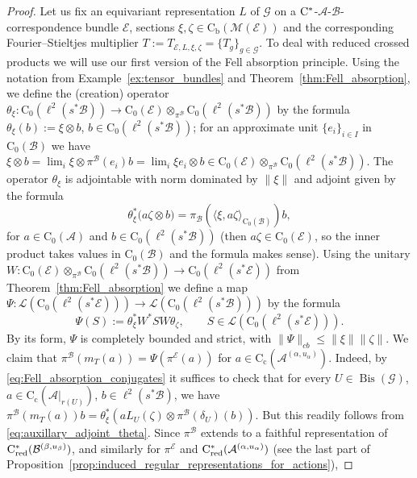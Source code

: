 \documentclass[11 pt, leqno]{amsart}
\numberwithin{equation}{section}
\theoremstyle{plain}
\theoremstyle{definition}
\newcommand*{\contc}{\mathrm{C_c}}%
\newcommand*{\contz}{\mathrm{C_0}}%
\newcommand*{\contb}{\mathrm{C_b}}%
\DeclareMathOperator{\red}{red}%
\DeclareMathOperator{\dashind}{-Ind}
\DeclareMathOperator{\Bis}{Bis}
\newcommand{\B}{\mathcal B}
\newcommand{\LL}{\mathcal L}
\newcommand{\M}{\mathcal M}
\newcommand{\m}{m}
\newcommand{\G}{\mathcal G} %
\newcommand{\EE}{\mathcal E}
\newcommand{\A}{\mathcal A}
\newcommand{\cst}{\ifmmode\mathrm{C}^*\else{$\mathrm{C}^*$}\fi}
\begin{document}
\begin{proof} 
Let us fix an equivariant representation $L$ of $\G$ on a $\cst$-$\A$-$\B$-correspondence bundle $\EE$, sections $\xi,\zeta\in \contb(\M(\EE))$ and the corresponding Fourier--Stieltjes multiplier $T := T_{\EE,L,\xi,\zeta} = \{ T_g \}_{g\in \G}$. 
To deal with reduced crossed products we will use our first version of the Fell absorption principle. 
Using the notation from Example~\ref{ex:tensor_bundles} and Theorem~\ref{thm:Fell_absorption}, we define the (creation) operator $\theta_\xi : \contz(\ell^2(s^*\B)) \to \contz(\EE)\otimes_{\pi^{\B}} \contz(\ell^2(s^*\B))$ by the formula $\theta_\xi (b):=\xi\otimes b$, $b\in \contz(\ell^2(s^*\B))$; for an approximate unit $\{e_i\}_{i\in I}$ in $\contz (\B)$ we have $\xi\otimes b= \lim_{i} \xi \otimes \pi^{\B}(e_i) b =\lim_{i} \xi e_i\otimes b \in \contz(\EE)\otimes_{\pi^{\B}} \contz(\ell^2(s^*\B))$. 
The operator $\theta_\xi$ is adjointable with norm dominated by $\|\xi\|$ and adjoint given by the formula 
\begin{equation}\label{eq:auxillary_adjoint_theta}
    \theta_\xi^*\big( a\zeta \otimes b) = \pi_{\B} (\langle \xi,  a \zeta\rangle_{\contz(\B)}) b,
\end{equation}
for $a\in \contz(\A)$ and $b\in \contz(\ell^2(s^*\B))$ (then $a\zeta\in \contz(\EE)$, so the inner product takes values in $\contz(\B)$ and the formula makes sense).
Using the unitary $W: \contz(\EE)\otimes_{\pi^{\B}} \contz(\ell^2(s^*\B))\to  \contz(\ell^2(s^*\EE))$ from Theorem~\ref{thm:Fell_absorption} we define a  map $\Psi : \LL(\contz(\ell^2(s^*\EE))) \to \LL( \contz(\ell^2(s^*\B)) )$ by the formula
\[
    \Psi(S) := \theta_\xi^* W^* S W\theta_\zeta, \qquad S\in \LL(\contz(\ell^2(s^*\EE))).
\]
By its form, $\Psi$ is completely bounded and strict, with $\|\Psi\|_{cb} \leq \|\xi\| \|\zeta\|$.
We claim that $\pi^{\B}(\m_{T}(a))=\Psi(\pi^{\EE}(a))$ %
for $a\in \contc(\A^{(\alpha,u_{\alpha})})$. 
Indeed, by \eqref{eq:Fell_absorption_conjugates} it suffices to check that for every  $U\in \Bis(\G)$, $a\in \contc(\A|_{r(U)})$, $b\in \ell^2(s^*\B)$, we have $\pi^{\B}(\m_{T}(a)) b= \theta_\xi^* ( aL_U(\zeta) \otimes \pi^{\B}(\delta_U)(b))$. 
But this readily follows from \eqref{eq:auxillary_adjoint_theta}.
Since $\pi^\B$ extends to a faithful representation of $\cst_{\red}(\B^{(\beta,u_{\beta})})$, and similarly for $\pi^\EE$ and $\cst_{\red}(\A^{(\alpha,u_{\alpha})})$ (see the last part of Proposition~\ref{prop:induced_regular_representations_for_actions}),

\end{proof}
\end{document}
